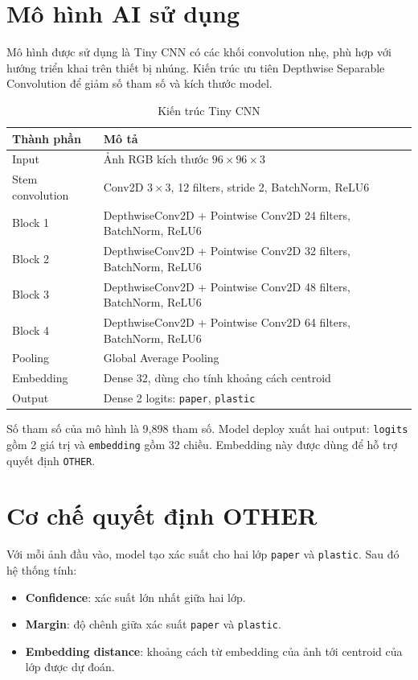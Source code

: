\documentclass[12pt,a4paper]{article}
\begin{document}
\section{Mô hình AI sử dụng}
Mô hình được sử dụng là Tiny CNN có các khối convolution nhẹ, phù hợp với hướng
triển khai trên thiết bị nhúng. Kiến trúc ưu tiên Depthwise Separable
Convolution để giảm số tham số và kích thước model.

\begin{table}[H]
\centering
\caption{Kiến trúc Tiny CNN}
\begin{tabular}{>{\raggedright\arraybackslash}p{5cm}
                >{\raggedright\arraybackslash}p{7cm}}
\toprule
\textbf{Thành phần} & \textbf{Mô tả} \\
\midrule
Input & Ảnh RGB kích thước $96 \times 96 \times 3$ \\
Stem convolution & Conv2D $3 \times 3$, 12 filters, stride 2, BatchNorm, ReLU6 \\
Block 1 & DepthwiseConv2D + Pointwise Conv2D 24 filters, BatchNorm, ReLU6 \\
Block 2 & DepthwiseConv2D + Pointwise Conv2D 32 filters, BatchNorm, ReLU6 \\
Block 3 & DepthwiseConv2D + Pointwise Conv2D 48 filters, BatchNorm, ReLU6 \\
Block 4 & DepthwiseConv2D + Pointwise Conv2D 64 filters, BatchNorm, ReLU6 \\
Pooling & Global Average Pooling \\
Embedding & Dense 32, dùng cho tính khoảng cách centroid \\
Output & Dense 2 logits: \texttt{paper}, \texttt{plastic} \\
\bottomrule
\end{tabular}
\end{table}

Số tham số của mô hình là 9,898 tham số. Model deploy xuất hai output:
\texttt{logits} gồm 2 giá trị và \texttt{embedding} gồm 32 chiều. Embedding này
được dùng để hỗ trợ quyết định \texttt{OTHER}.

\section{Cơ chế quyết định OTHER}
Với mỗi ảnh đầu vào, model tạo xác suất cho hai lớp \texttt{paper} và
\texttt{plastic}. Sau đó hệ thống tính:

\begin{itemize}
    \item \textbf{Confidence}: xác suất lớn nhất giữa hai lớp.
    \item \textbf{Margin}: độ chênh giữa xác suất \texttt{paper} và
    \texttt{plastic}.
    \item \textbf{Embedding distance}: khoảng cách từ embedding của ảnh tới
    centroid của lớp được dự đoán.
\end{itemize}
\end{document}
